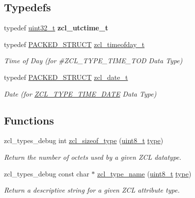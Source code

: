 \subsection*{Typedefs}
\begin{DoxyCompactItemize}
\item 
\hypertarget{group__zcl__types_gadd8ad64f3ae1ee581114f9ca39f3621f}{typedef \hyperlink{group__hal__dos_ga09a1e304d66d35dd47daffee9731edaa}{uint32\-\_\-t} {\bfseries zcl\-\_\-utctime\-\_\-t}}\label{group__zcl__types_gadd8ad64f3ae1ee581114f9ca39f3621f}

\item 
typedef \hyperlink{group___s_x_a_ga4233297bd31be5c273d4fb0758cc54d7}{P\-A\-C\-K\-E\-D\-\_\-\-S\-T\-R\-U\-C\-T} \hyperlink{group__zcl__types_gafa65aea1347d7c84cd0019a7e013b8f5}{zcl\-\_\-timeofday\-\_\-t}
\begin{DoxyCompactList}\small\item\em Time of Day (for \#\-Z\-C\-L\-\_\-\-T\-Y\-P\-E\-\_\-\-T\-I\-M\-E\-\_\-\-T\-O\-D Data Type) \end{DoxyCompactList}\item 
typedef \hyperlink{group___s_x_a_ga4233297bd31be5c273d4fb0758cc54d7}{P\-A\-C\-K\-E\-D\-\_\-\-S\-T\-R\-U\-C\-T} \hyperlink{group__zcl__types_ga9ea8f9ebe25e922be76329748b8398b5}{zcl\-\_\-date\-\_\-t}
\begin{DoxyCompactList}\small\item\em Date (for \hyperlink{group__zcl__types_gad5552b0825d941f0ccd7b1d797dc091b}{Z\-C\-L\-\_\-\-T\-Y\-P\-E\-\_\-\-T\-I\-M\-E\-\_\-\-D\-A\-T\-E} Data Type) \end{DoxyCompactList}\end{DoxyCompactItemize}
\subsection*{Functions}
\begin{DoxyCompactItemize}
\item 
zcl\-\_\-types\-\_\-debug int \hyperlink{group__zcl__types_ga6134ab27d38abd300d008345e21fe560}{zcl\-\_\-sizeof\-\_\-type} (\hyperlink{group__hal_gae1affc9ca37cfb624959c866a73f83c2}{uint8\-\_\-t} \hyperlink{group__zcl_ga1d127017fb298b889f4ba24752d08b8e}{type})
\begin{DoxyCompactList}\small\item\em Return the number of octets used by a given Z\-C\-L datatype. \end{DoxyCompactList}\item 
zcl\-\_\-types\-\_\-debug const char $\ast$ \hyperlink{group__zcl__types_ga798e87a8b8f240a33706b7bc37c9ede1}{zcl\-\_\-type\-\_\-name} (\hyperlink{group__hal_gae1affc9ca37cfb624959c866a73f83c2}{uint8\-\_\-t} \hyperlink{group__zcl_ga1d127017fb298b889f4ba24752d08b8e}{type})
\begin{DoxyCompactList}\small\item\em Return a descriptive string for a given Z\-C\-L attribute type. \end{DoxyCompactList}\end{DoxyCompactItemize}
